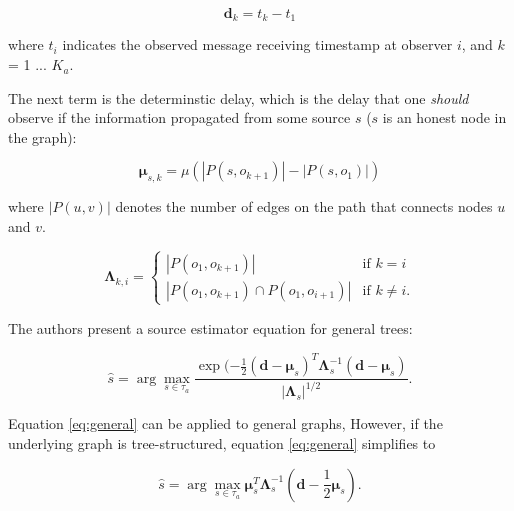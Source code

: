 \begin{equation}
  \boldsymbol{d}_k = t_{k} - t_1
\end{equation}

where $t_i$ indicates the observed message receiving timestamp at observer $i$, and $k$ = 1 ... $K_a$.

The next term is the determinstic delay, which is the delay that one \emph{should} observe if the information propagated from some source $s$ ($s$ is an honest node in the graph):

\begin{equation}
  \boldsymbol{\mu}_{s,k} = \mu (|P(s, o_{k+1})| - |P(s, o_1)|)
\end{equation}

where $|P(u, v)|$ denotes the number of edges on the path that connects nodes $u$ and $v$. 

\begin{equation}
  \boldsymbol{\Lambda}_{k, i} = \begin{cases}
    |P(o_1, o_{k+1})| & \text{if $k = i$} \\
    |P(o_1, o_{k+1}) \cap P(o_1, o_{i+1})| & \text{if $k \neq i$}.
  \end{cases}
\end{equation}


The authors present a source estimator equation for general trees:

\begin{equation}
\label{eq:general}
\hat{s} = \arg\max_{s \in \tau_{a}} \dfrac{\exp(-\frac{1}{2} (\boldsymbol{d} - \boldsymbol{\mu}_{s})^{T} \boldsymbol{\Lambda}_s^{-1} (\boldsymbol{d} - \boldsymbol{\mu}_s) }{|\boldsymbol{\Lambda}_s|^{1/2}}.
\end{equation}

Equation \ref{eq:general} can be applied to general graphs, However, if the underlying graph is tree-structured, equation \ref{eq:general} simplifies to

\begin{equation}
\label{eq:tree}
\hat{s} = \arg\max_{s \in \tau_{a}} \boldsymbol{\mu}_{s}^{T} \boldsymbol{\Lambda}_s^{-1} (\boldsymbol{d} - \frac{1}{2}\boldsymbol{\mu}_s).
\end{equation}
